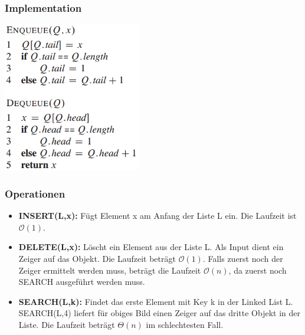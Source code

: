 \documentclass[10pt,a4paper,twocolumn]{article}
\begin{document}
\subsubsection{Implementation}
\begin{center}
\includegraphics[width=6cm]{images/queue-implementation.png}
\end{center}

%
%

\subsubsection{Operationen}
\begin{itemize}
\item \textbf{INSERT(L,x):} Fügt Element x am Anfang der Liste L ein. Die Laufzeit ist $\mathcal{O}(1)$.
\item \textbf{DELETE(L,x):} Löscht ein Element aus der Liste L. Als Input dient ein Zeiger auf das Objekt. Die Laufzeit beträgt $\mathcal{O}(1)$. Falls zuerst noch der Zeiger ermittelt werden muss, beträgt die Laufzeit $\mathcal{O}(n)$, da zuerst noch SEARCH ausgeführt werden muss.
\item \textbf{SEARCH(L,k):} Findet das erste Element mit Key k in der Linked List L. SEARCH(L,4) liefert für obiges Bild einen Zeiger auf das dritte Objekt in der Liste. Die Laufzeit beträgt $\Theta(n)$ im schlechtesten Fall.
\end{itemize}
\end{document}
